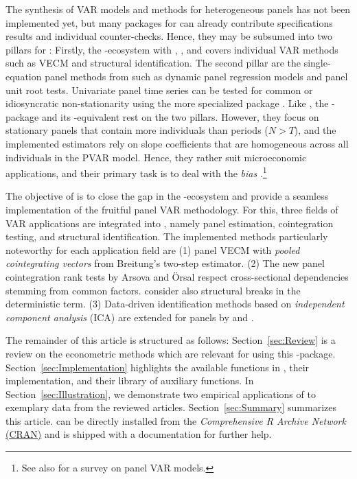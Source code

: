 The synthesis of VAR models and methods for heterogeneous panels has not been implemented yet, but many packages for  \citeyearpar{RCore2020} can already contribute specifications results and individual counter-checks. Hence, they may be subsumed into two pillars for : Firstly, the -ecosystem with  \citep{Pfaff2008},  \citep{Pfaff2008a}, and  \citep{LangeEtAl_fc} covers individual VAR methods such as VECM and structural identification. The second pillar are the single-equation panel methods from  \citep{CroissantMillo2008} such as dynamic panel regression models and panel unit root tests. Univariate panel time series can be tested for common or idiosyncratic non-stationarity using the more specialized package  \citep{Bronder2016}. Like , the -package  \citep{SigmundFerstl2019} and its -equivalent  \citep{AbrigoLove2016} rest on the two pillars. However, they focus on stationary panels that contain more individuals than periods ($ N > T $), and the implemented estimators rely on slope coefficients that are homogeneous across all individuals in the PVAR model. Hence, they rather suit microeconomic applications, and their primary task is to deal with the \textit{\citeauthor{Nickell1981} bias} \citeyearpar{Nickell1981}.\footnote{See also \citet{CanovaCiccarelli2013} for a survey on panel VAR models.} 

The objective of  is to close the gap in the -ecosystem and provide a seamless implementation of the fruitful panel VAR methodology. For this, three fields of VAR applications are integrated into , namely  panel estimation, cointegration testing, and structural identification. The implemented methods particularly noteworthy for each application field are (1) panel VECM with \textit{pooled cointegrating vectors} from Breitung's \citeyearpar{Breitung2005} two-step estimator. (2) The new panel cointegration rank tests by Arsova and Örsal \citeyearpar{ArsovaOersal2017,ArsovaOersal2018} respect cross-sectional dependencies stemming from common factors. \citet{ArsovaOersal2020} consider also structural breaks in the deterministic term. (3) Data-driven identification methods based on \textit{independent component analysis} (ICA) are extended for panels by \citet{CalhounEtAl2002} and \cite{Herwartz2017}.

The remainder of this article is structured as follows: Section~\ref{sec:Review} is a review on the econometric methods which are relevant for using this -package. Section~\ref{sec:Implementation} highlights the available functions in , their implementation, and their library of auxiliary functions. In Section~\ref{sec:Illustration}, we demonstrate two empirical applications of  to exemplary data from the reviewed articles. Section~\ref{sec:Summary} summarizes this article.  can be directly installed from the \textit{Comprehensive R Archive Network} \href{https://CRAN.R-project.org/package=pvars}{(CRAN)} and is shipped with a documentation for further help.


